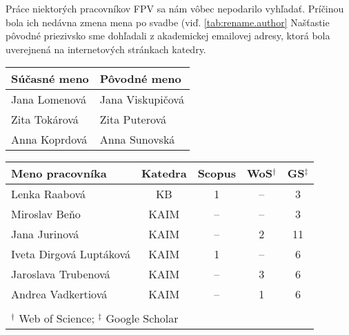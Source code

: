 Práce niektorých pracovníkov FPV sa nám vôbec nepodarilo vyhľadať. Príčinou
bola ich nedávna zmena mena po svadbe (viď. \ref{tab:rename.author} Našťastie
pôvodné priezivsko sme dohľadali z akademickej emailovej adresy, ktorá bola
uverejnená na internetových stránkach katedry.

\begin{SCtable}
\centering\small
  \caption[Mená pracovníkov FPV, u ktorých došlo k zmene priezivska] {Zoznam
  pracovníkov FPV, ku ktorých došlo k zmene priezivska. Pôvodné priezivsko sme
  dohľadali z akademickej emailovej adresy.}
\label{tab:rename.author}
\begin{tabular}{ll}
  \toprule\noalign{\vspace{.3ex}}
  Súčasné meno    & Pôvodné meno  \\[0.3ex]
  \midrule\noalign{\vspace{.5ex}}
  Jana Lomenová & Jana Viskupičová \\
  Zita Tokárová & Zita Puterová \\
  Anna Koprdová & Anna Sunovská \\[0.5ex]
  \bottomrule 
\end{tabular}
\end{SCtable}

\begin{SCtable}
\centering\small
  \caption[Mená pracovníkov FPV, pre ktorých sa nám nepodarilo získať všetky
  dáta]{Zoznam Pracovníkov FPV, pre ktorých sa nepodarilo získať z niektorých
  citačných registrov žiadne dáta.  V posledných troch sĺpcoch je uvedený počet
  publikácií, ktoré sa nám podarilo získať.}
\label{tab:missing.author}
\begin{tabular}{lcccc}
  \toprule\noalign{\vspace{.3ex}}
  Meno pracovníka            & Katedra & Scopus & WoS$^\dagger$ & GS$^\ddagger$ \\[0.3ex]
  \midrule\noalign{\vspace{.5ex}}
  Lenka Raabová              &  KB  &  1     & --  & 3  \\
  Miroslav Beňo              & KAIM & --     & --  & 3  \\
  Jana Jurinová              & KAIM & --     & 2   & 11 \\
  Iveta Dirgová Luptáková    & KAIM & 1      & --  & 6  \\
  Jaroslava Trubenová        & KAIM & --     & 3   & 6  \\
  Andrea Vadkertiová         & KAIM & --     & 1   & 6  \\[0.5ex]
  \bottomrule \\[-2ex]
  \multicolumn{5}{l}{\footnotesize $^\dagger$ Web of Science; $^\ddagger$ Google Scholar} 
\end{tabular}
\end{SCtable}


